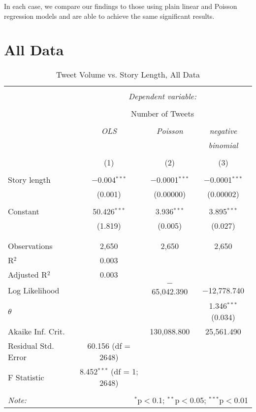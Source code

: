 In each case, we compare our findings to those using plain linear and Poisson regression models and are able to achieve the same significant results.  

\section{All Data}
 
\begin{table}[!htbp] \centering 
  \caption{Tweet Volume vs. Story Length, All Data} 
  \label{} 
    \begin{tabular}{@{\extracolsep{5pt}}lccc} 
    \\[-1.8ex]\hline 
    \hline \\[-1.8ex] 
     & \multicolumn{3}{c}{\textit{Dependent variable:}} \\ 
    \cline{2-4} 
    \\[-1.8ex] & \multicolumn{3}{c}{Number of Tweets} \\ 
    \\[-1.8ex] & \textit{OLS} & \textit{Poisson} & \textit{negative} \\ 
     & \textit{} & \textit{} & \textit{binomial} \\ 
    \\[-1.8ex] & (1) & (2) & (3)\\ 
    \hline \\[-1.8ex] 
     Story length & $-$0.004$^{***}$ & $-$0.0001$^{***}$ & $-$0.0001$^{***}$ \\ 
      & (0.001) & (0.00000) & (0.00002) \\ 
      & & & \\ 
     Constant & 50.426$^{***}$ & 3.936$^{***}$ & 3.895$^{***}$ \\ 
      & (1.819) & (0.005) & (0.027) \\ 
      & & & \\ 
    \hline \\[-1.8ex] 
    Observations & 2,650 & 2,650 & 2,650 \\ 
    R$^{2}$ & 0.003 &  &  \\ 
    Adjusted R$^{2}$ & 0.003 &  &  \\ 
    Log Likelihood &  & $-$65,042.390 & $-$12,778.740 \\ 
    $\theta$ &  &  & 1.346$^{***}$  (0.034) \\ 
    Akaike Inf. Crit. &  & 130,088.800 & 25,561.490 \\ 
    Residual Std. Error & 60.156 (df = 2648) &  &  \\ 
    F Statistic & 8.452$^{***}$ (df = 1; 2648) &  &  \\ 
    \hline 
    \hline \\[-1.8ex] 
    \textit{Note:}  & \multicolumn{3}{r}{$^{*}$p$<$0.1; $^{**}$p$<$0.05; $^{***}$p$<$0.01} \\ 
    \end{tabular} 
\end{table} 
\newpage
 

